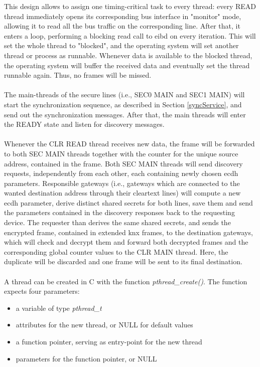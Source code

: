 This design allows to assign one timing-critical task to every thread: every READ thread immediately opens its corresponding bus interface in "monitor" mode, allowing it
to read all the bus traffic on the corresponding line. After that, it enters a loop, performing a blocking read call to \gls{eibd} on every iteration.
This will set the whole thread to "blocked", and the operating
system will set another thread or process as runnable. Whenever data is available to the blocked thread, the operating system will buffer the received data and eventually set the
thread runnable again. Thus, no frames will be missed.
\\
\\
The main-threads of the secure lines (i.e., SEC0 MAIN and SEC1 MAIN) will start the synchronization sequence, as described in Section \ref{syncService}, and send out
the synchronization messages. After  that, the main threads will enter the READY state and listen for discovery messages.
\\
\\
Whenever the CLR READ thread receives new data, the frame will be forwarded to both SEC MAIN threads together with the counter for the unique source address, contained
in the frame. Both SEC MAIN threads will send discovery requests, independently from each other, each containing newly chosen \gls{ecdh} parameters. Responsible gateways (i.e.,
gateways which are connected to the wanted destination address through their cleartext lines) will compute a new \gls{ecdh} parameter, derive distinct shared secrets for both lines,
save them and send the parameters contained in the discovery responses back to the requesting device. The requester than derives the same shared secrets, and sends the encrypted frame,
contained in extended \gls{knx} frames, to the destination gateways, which will check and decrypt them and forward both decrypted frames and the corresponding global counter values
to the CLR MAIN thread. Here, the duplicate will be discarded and one frame will be sent to its final destination.
\\
\\
A thread can be created in C with the function \textit{pthread\_create()}. The function expects four parameters:
\begin{itemize}
 \item a variable of type \textit{pthread\_t}
 \item attributes for the new thread, or NULL for default values
 \item a function pointer, serving as entry-point for the new thread
 \item parameters for the function pointer, or NULL
\end{itemize}
